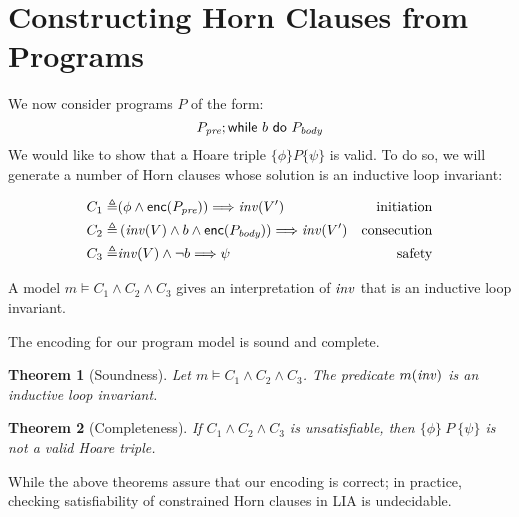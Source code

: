 \documentclass{amsart}
\newtheorem{theorem}{Theorem}[section]
\theoremstyle{definition}
\theoremstyle{remark}
\numberwithin{equation}{section}
\begin{document}
\section{Constructing Horn Clauses from Programs}
We now consider programs $P$
of the form:
$$P_{\emph{pre}}; \mathsf{while}~ b ~\mathsf{do}~ P_{\emph{body}}$$
We would like to show that a Hoare triple
$\{\phi\} P \{\psi\}$ is valid.
To do so, we will generate a number of Horn clauses
whose solution is an inductive loop invariant:

\begin{align*}
  C_1 \triangleq&
  (\phi \land \enc(P_\pre)) \Longrightarrow \inv(V') & \text{initiation}\\
  C_2 \triangleq&
  \left(\inv(V) \land b \land
    \enc(P_\body)\right) \Longrightarrow \inv(V') & \text{consecution}\\
%
  C_3 \triangleq&
    \inv(V) \land \neg b \Longrightarrow \psi & \text{safety}
\end{align*}

A model $m \models C_1\land C_2 \land C_3$
gives an interpretation of $\mathit{inv}$ that is an inductive loop invariant.

The encoding for our program model is sound and complete.

\begin{theorem}[Soundness]
Let $m \models C_1 \land C_2 \land C_3$.
The predicate $m(\mathit{inv})$ is an inductive loop invariant.
\end{theorem}

\begin{theorem}[Completeness]
If $C_1 \land C_2 \land C_3$ is unsatisfiable,
then $\{\phi\} ~ P ~ \{\psi\}$ is not a valid Hoare triple.
\end{theorem}

While the above theorems assure that our encoding
is correct; in practice, checking satisfiability of
constrained Horn clauses in LIA is undecidable.
\end{document}
